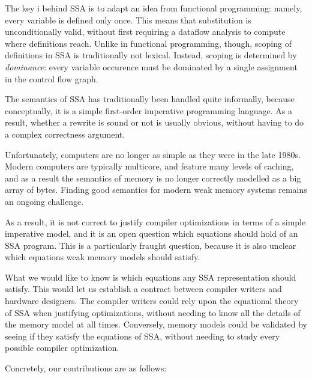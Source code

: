 \documentclass[acmsmall,screen,review]{acmart}
\begin{document}
The key i behind SSA is to adapt an idea from functional
programming: namely, every variable is defined only once. This means
that substitution is unconditionally valid, without first requiring a
dataflow analysis to compute where definitions reach. Unlike in
functional programming, though, scoping of definitions in SSA is
traditionally not lexical. Instead, scoping is determined by
\emph{dominance}: every variable occurence must be dominated by a
single assignment in the control flow graph.

The semantics of SSA has traditionally been handled quite informally,
because conceptually, it is a simple first-order imperative
programming language. As a result, whether a rewrite is sound or
not is usually obvious, without having to do a complex correctness
argument.

Unfortunately, computers are no longer as simple as they were in the
late 1980s. Modern computers are typically multicore, and feature many
levels of caching, and as a result the semantics of memory is no
longer correctly modelled as a big array of bytes. Finding good
semantics for modern weak memory systems remains an ongoing challenge.

As a result, it is not correct to justify compiler optimizations in
terms of a simple imperative model, and it is an open question which
equations should hold of an SSA program. This is a particularly
fraught question, because it is also unclear which equations weak
memory models should satisfy.

What we would like to know is which equations any SSA representation
should satisfy. This would let us establish a contract between
compiler writers and hardware designers. The compiler writers could
rely upon the equational theory of SSA when justifying optimizations,
without needing to know all the details of the memory model at all
times.  Conversely, memory models could be validated by seeing if they
satisfy the equations of SSA, without needing to study every possible
compiler optimization.

Concretely, our contributions are as follows: 
\end{document}
